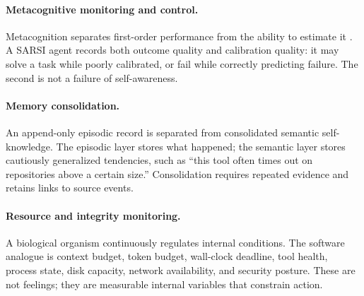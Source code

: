 \documentclass[11pt]{article}
\begin{document}
\paragraph{Metacognitive monitoring and control.} Metacognition separates first-order performance from the ability to estimate it \citep{fleming2010introspective,fleming2012neural,flavell1979metacognition,nelson1990metamemory}. A SARSI agent records both outcome quality and calibration quality: it may solve a task while poorly calibrated, or fail while correctly predicting failure. The second is not a failure of self-awareness.

\paragraph{Memory consolidation.} An append-only episodic record is separated from consolidated semantic self-knowledge. The episodic layer stores what happened; the semantic layer stores cautiously generalized tendencies, such as ``this tool often times out on repositories above a certain size.'' Consolidation requires repeated evidence and retains links to source events.

\paragraph{Resource and integrity monitoring.} A biological organism continuously regulates internal conditions. The software analogue is context budget, token budget, wall-clock deadline, tool health, process state, disk capacity, network availability, and security posture. These are not feelings; they are measurable internal variables that constrain action.
\end{document}
